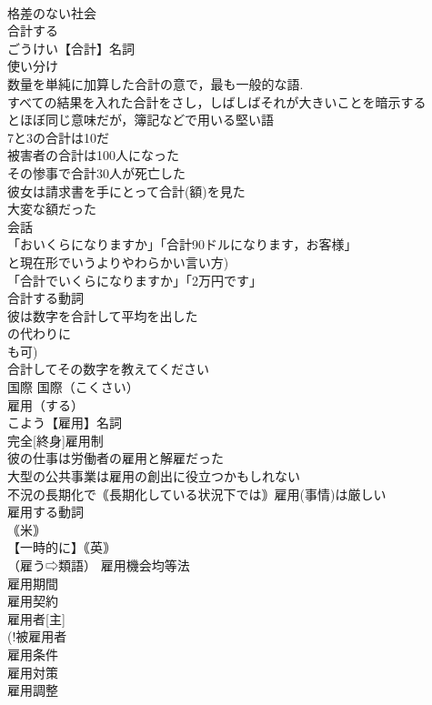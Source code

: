 \documentclass[8pt]{extreport}
\begin{document}
\begin{CJK}{UTF8}{min}
\\	格差のない社会 
\\	合計する		
\\	ごうけい【合計】名詞 
\\	使い分け 
\\	数量を単純に加算した合計の意で，最も一般的な語. 
\\	すべての結果を入れた合計をさし，しばしばそれが大きいことを暗示する
\\	とほぼ同じ意味だが，簿記などで用いる堅い語
\\	7と3の合計は10だ 
\\	被害者の合計は100人になった 
\\	その惨事で合計30人が死亡した 
\\	彼女は請求書を手にとって合計(額)を見た
\\	大変な額だった 
\\	会話 
\\	「おいくらになりますか」「合計90ドルになります，お客様」 
\\	と現在形でいうよりやわらかい言い方) 
\\	「合計でいくらになりますか」「2万円です」 
\\	合計する動詞 
\\	彼は数字を合計して平均を出した 
\\	の代わりに 
\\	も可) 
\\	合計してその数字を教えてください 
\\	国際		国際（こくさい） 
\\	雇用（する）		
\\	こよう【雇用】名詞 
\\	完全[終身]雇用制 
\\	彼の仕事は労働者の雇用と解雇だった 
\\	大型の公共事業は雇用の創出に役立つかもしれない 
\\	不況の長期化で｟長期化している状況下では｠雇用(事情)は厳しい 
\\	雇用する動詞 
\\	｟米｠ 
\\	【一時的に】｟英｠
\\	（雇う⇨類語） 雇用機会均等法 
\\	雇用期間 
\\	雇用契約 
\\	雇用者[主] 
\\	(!被雇用者 
\\	雇用条件 
\\	雇用対策 
\\	雇用調整 

\end{CJK}
\end{document}
